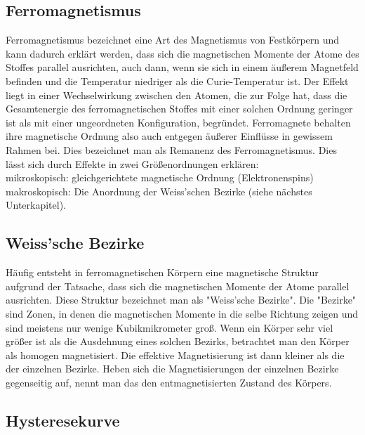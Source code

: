 \documentclass[a4paper,10pt]{scrartcl}
\begin{document}
	\subsection{Ferromagnetismus}
		
		Ferromagnetismus bezeichnet eine Art des Magnetismus von Festkörpern und kann dadurch erklärt werden, dass sich die magnetischen Momente der Atome des Stoffes parallel ausrichten, auch dann, wenn sie sich in einem äußerem Magnetfeld befinden und die Temperatur niedriger als die Curie-Temperatur ist. Der Effekt liegt in einer Wechselwirkung zwischen den Atomen, die zur Folge hat, dass die Gesamtenergie des ferromagnetischen Stoffes mit einer solchen Ordnung geringer ist als mit einer ungeordneten Konfiguration, begründet. Ferromagnete behalten ihre magnetische Ordnung also auch entgegen äußerer Einflüsse in gewissem Rahmen bei. Dies bezeichnet man als Remanenz des Ferromagnetismus. Dies lässt sich durch Effekte in zwei Größenordnungen erklären: \\
		mikroskopisch: gleichgerichtete magnetische Ordnung (Elektronenspins)\\
		makroskopisch: Die Anordnung der Weiss'schen Bezirke (siehe nächstes Unterkapitel).
		
	\subsection{Weiss'sche Bezirke}
		
		Häufig entsteht in ferromagnetischen Körpern eine magnetische Struktur aufgrund der Tatsache, dass sich die magnetischen Momente der Atome parallel ausrichten. Diese Struktur bezeichnet man als "Weiss'sche Bezirke". Die "Bezirke" sind Zonen, in denen die magnetischen Momente in die selbe Richtung zeigen und sind meistens nur wenige Kubikmikrometer groß. Wenn ein Körper sehr viel größer ist als die Ausdehnung eines solchen Bezirks, betrachtet man den Körper als homogen magnetisiert. Die effektive Magnetisierung ist dann kleiner als die der einzelnen Bezirke. Heben sich die Magnetisierungen der einzelnen Bezirke gegenseitig auf, nennt man das den entmagnetisierten Zustand des Körpers.
		
	\subsection{Hysteresekurve}
	
\end{document}
